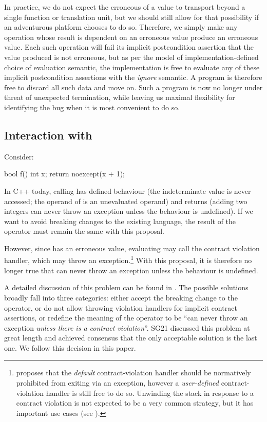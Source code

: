 In practice, we do not expect the erroneous of a value to transport beyond a single function or translation unit, but we should still allow for that possibility if an adventurous platform chooses to do so.   Therefore, we simply make any operation whose result is dependent on an erroneous value produce an erroneous value. Each such operation will fail its implicit postcondition assertion that the value produced is not erroneous, but as per the \cite{P2900R13} model of implementation-defined choice of evaluation semantic, the implementation is free to evaluate any of these implicit postcondition assertions with the \emph{ignore} semantic. A program is therefore free to discard all such data and move on. Such a program is now no longer under threat of unexpected termination, while leaving us maximal flexibility for identifying the bug when it is most convenient to do so.

\subsection{Interaction with }

Consider:
\begin{codeblock}
bool f() {
  int x;
  return noexcept(x + 1);
}
\end{codeblock}
In C++ today, calling  has defined behaviour (the indeterminate value is never accessed; the operand of  is an unevaluated operand) and returns  (adding two integers can never throw an exception unless the behaviour is undefined). If we want to avoid breaking changes to the existing language, the result of the  operator must remain the same with this proposal.

However, since  has an erroneous value, evaluating  may call the contract violation handler, which may throw an exception.\footnote{\cite{P3577R0} proposes that the \emph{default} contract-violation handler should be normatively prohibited from exiting via an exception, however a \emph{user-defined} contract-violation handler is still free to do so. Unwinding the stack in response to a contract violation is not expected to be a very common strategy, but it has important use cases (see \cite{TODOVILLESPAPER}).} With this proposal, it is therefore no longer true that  can never throw an exception unless the behaviour is undefined.

A detailed discussion of this problem can be found in \cite{P3541R1}. The possible solutions broadly fall into three categories: either accept the breaking change to the  operator, or do not allow throwing violation handlers for implicit contract assertions, or redefine the  meaning of the  operator to be ``can never throw an exception \emph{unless there is a contract violation}''. SG21 discussed this problem at great length and achieved consensus that the only acceptable solution is the last one. We follow this decision in this paper.

